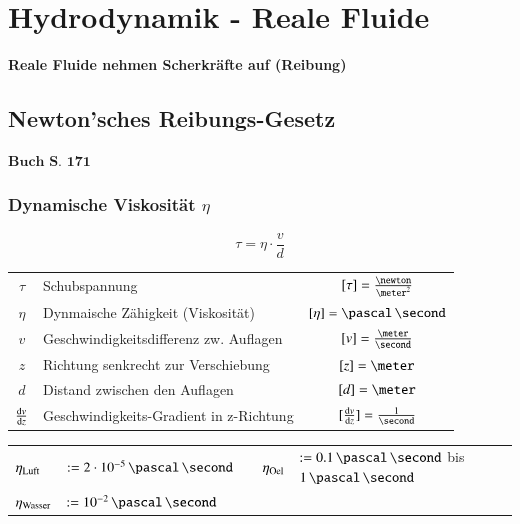 \section{Hydrodynamik - Reale Fluide}

\textbf{Reale Fluide nehmen Scherkräfte auf (Reibung)}

\subsection{Newton'sches Reibungs-Gesetz}
\begin{flushright}
	$\boxed{\textbf{Buch S. 171}}$
\end{flushright}

\subsubsection[Dynamische Viskosität]{Dynamische Viskosität $\eta$}

$$ \boxed{ \tau = \eta \cdot \frac{v}{d} } $$

\renewcommand{\arraystretch}{1.3}
\begin{tabular}{c l c}
    $\tau$                      & Schubspannung                             & $[\tau] = \frac{\newton}{\meter^2}$                                \\
    $\eta$                      & Dynmaische Zähigkeit (Viskosität)         & $[\eta] = \pascal \, \second$                     \\
    $v$                         & Geschwindigkeitsdifferenz zw. Auflagen    & $[v] = \frac{\meter}{\second}$                    \\
    $z$                         & Richtung senkrecht zur Verschiebung       & $[z] = \meter$                                    \\
    $d$                         & Distand zwischen den Auflagen             & $[d] = \meter$                                    \\
    $\frac{\mathop{} \! \mathrm{d} v}{\mathop{} \! \mathrm{d} z}$   & Geschwindigkeits-Gradient in z-Richtung   & $[\frac{\diff v}{\diff z}] = \frac{1}{\second}$ 
\end{tabular}
\renewcommand{\arraystretch}{1}

\medskip



\renewcommand{\arraystretch}{1.5}
\begin{tabular}{ll c|c ll}
    $\eta_{\rm Luft}$   & $:= 2 \cdot 10^{-5} \, \pascal \, \second$    & &  $\eta_{\rm Oel}$   & $:= 0.1 \, \pascal \, \second$ \; bis \; $1 \, \pascal \, \second$ \\
    $\eta_{\rm Wasser}$ & $:= 10^{-2} \, \pascal \, \second$            & & \\
\end{tabular}
\renewcommand{\arraystretch}{1}

